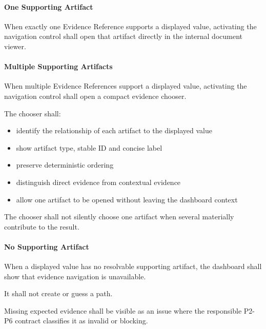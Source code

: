 \hypertarget{one-supporting-artifact}{%
\paragraph{One Supporting Artifact}\label{one-supporting-artifact}}

When exactly one Evidence Reference supports a displayed value, activating the navigation control shall open that artifact directly in the internal document viewer.

\hypertarget{multiple-supporting-artifacts}{%
\paragraph{Multiple Supporting Artifacts}\label{multiple-supporting-artifacts}}

When multiple Evidence References support a displayed value, activating the navigation control shall open a compact evidence chooser.

The chooser shall:

\begin{itemize}
\tightlist
\item
  identify the relationship of each artifact to the displayed value
\item
  show artifact type, stable ID and concise label
\item
  preserve deterministic ordering
\item
  distinguish direct evidence from contextual evidence
\item
  allow one artifact to be opened without leaving the dashboard context
\end{itemize}

The chooser shall not silently choose one artifact when several materially contribute to the result.

\hypertarget{no-supporting-artifact}{%
\paragraph{No Supporting Artifact}\label{no-supporting-artifact}}

When a displayed value has no resolvable supporting artifact, the dashboard shall show that evidence navigation is unavailable.

It shall not create or guess a path.

Missing expected evidence shall be visible as an issue where the responsible P2-P6 contract classifies it as invalid or blocking.

